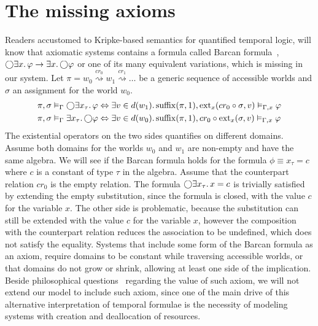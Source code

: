 \section{The missing axioms}
Readers accustomed to Kripke-based semantics for quantified temporal logic, will know that axiomatic systems contains a
formula called Barcan formula~\cite{barcan_functional_1946}, $\bigcirc{\exists {x} \ldotp {\varphi}} \to \exists {x} \ldotp {\bigcirc{\varphi}}$
or one of its many equivalent variations, which is missing in our system.  Let $\pi = w_0
\overset{cr_0}{\rightsquigarrow} w_1 \overset{cr_1}{\rightsquigarrow} \ldots$ be a generic sequence of accessible worlds
and $\sigma$ an assignment for the world $w_0$.
\begin{align*}
  {\pi}, {\sigma} \vDash_{\Gamma} {\bigcirc{\exists {x_\tau} \ldotp {\varphi}}}
    &\Leftrightarrow \exists {v \in d(w_1)} \ldotp {{\operatorname{suffix}(\pi, 1)}, {\operatorname{ext}_{x}({cr_0 \circ \sigma},{v})} \vDash_{\Gamma,x} {\varphi}} \\
  {\pi}, {\sigma} \vDash_{\Gamma} {\exists {x_\tau} \ldotp {\bigcirc{\varphi}}}
    &\Leftrightarrow \exists {v \in d(w_0)} \ldotp {{\operatorname{suffix}(\pi, 1)}, {cr_0 \circ \operatorname{ext}_{x}({\sigma},{v})} \vDash_{\Gamma,x} {\varphi}}
\end{align*}
The existential operators on the two sides quantifies on different domains. 
Assume both domains for the worlds $w_0$ and $w_1$ are non-empty and have the same algebra. We will see if the Barcan
formula holds for the formula $\phi \equiv x_\tau = c$ where $c$ is a constant of type $\tau$ in the algebra.  Assume
that the counterpart relation $cr_0$ is the empty relation. The formula $\bigcirc{\exists {x_\tau} \ldotp {x = c}}$ is trivially
satisfied by extending the empty substitution, since the formula is closed, with the value $c$ for the variable $x$. The
other side is problematic, because the substitution can still be extended with the value $c$ for the variable $x$,
however the composition with the counterpart relation reduces the association to be undefined, which does not satisfy
the equality. Systems that include some form of the Barcan formula as an axiom, require domains to be constant while
traversing accessible worlds, or that domains do not grow or shrink, allowing at least one side of the implication.
Beside philosophical questions~\cite{williamson_modal_2015} regarding the value of such axiom, we will not extend our
model to include such axiom, since one of the main drive of this alternative interpretation of temporal formulae is the
necessity of modeling systems with creation and deallocation of resources.


